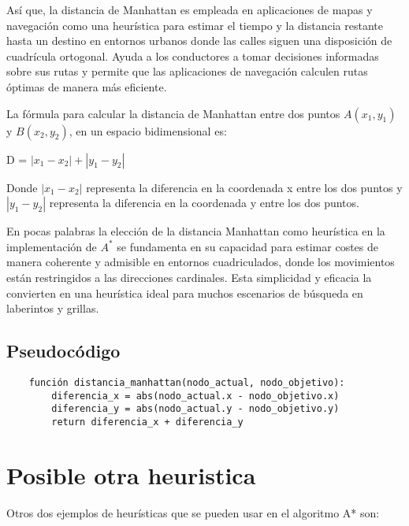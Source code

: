 Así que, la distancia de Manhattan es empleada en aplicaciones de mapas y navegación como una heurística para estimar el tiempo y la distancia restante hasta un destino en entornos urbanos donde las calles siguen una disposición de cuadrícula ortogonal. Ayuda a los conductores a tomar decisiones informadas sobre sus rutas y permite que las aplicaciones de navegación calculen rutas óptimas de manera más eficiente.


La fórmula para calcular la distancia de Manhattan entre dos puntos $A(x_1, y_1)$ y $B(x_2,y_2)$, en un espacio bidimensional es:
\begin{center}
    D = $|x_1 - x_2| + |y_1 - y_2|$
\end{center}

Donde $|x_1 - x_2|$ representa la diferencia en la coordenada x entre los dos puntos y  $|y_1 - y_2|$ representa la diferencia en la coordenada 
y entre los dos puntos.

En pocas palabras la elección de la distancia Manhattan como heurística en la implementación de $A^{*}$ se fundamenta en su capacidad para estimar costes de manera coherente y admisible en entornos cuadriculados, donde los movimientos están restringidos a las direcciones cardinales. Esta simplicidad y eficacia la convierten en una heurística ideal para muchos escenarios de búsqueda en laberintos y grillas.
\subsection*{Pseudocódigo}
\begin{verbatim}
    función distancia_manhattan(nodo_actual, nodo_objetivo):
        diferencia_x = abs(nodo_actual.x - nodo_objetivo.x)
        diferencia_y = abs(nodo_actual.y - nodo_objetivo.y)
        return diferencia_x + diferencia_y
    \end{verbatim}
\section{Posible otra heuristica}
Otros dos ejemplos de heurísticas que se pueden usar en el algoritmo A* son:

